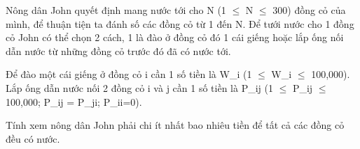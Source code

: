 Nông dân John quyết định mang nước tới cho N (1  $\le$  N  $\le$  300) đồng cỏ của mình, để thuận tiện ta đánh số các đồng cỏ từ 1 đến N. Để tưới nước cho 1 đồng cỏ John có thể chọn 2 cách, 1 là đào ở đồng cỏ  đó 1 cái giếng hoặc lắp ống nối dẫn nước từ những đồng cỏ trước đó đã có nước tới.  

   Để đào một cái giếng ở đồng cỏ i cần 1 số tiền là W\_i (1  $\le$  W\_i  $\le$  100,000). Lắp ống dẫn nước nối 2 đồng cỏ i và j cần 1 số tiền là P\_ij (1  $\le$  P\_ij  $\le$  100,000; P\_ij = P\_ji; P\_ii=0).  

   Tính xem nông dân John phải chi ít nhất bao nhiêu tiền để tất cả các  đồng cỏ đều có nước.